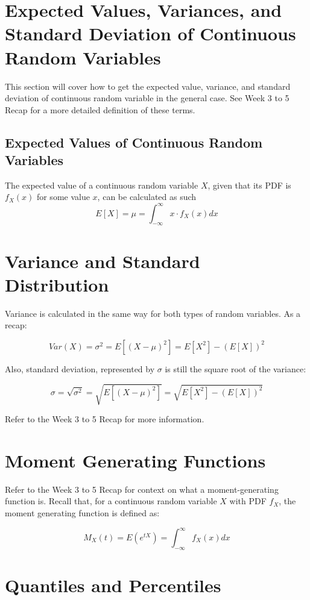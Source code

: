 \documentclass[12pt]{article}
\begin{document}
\section*{Expected Values, Variances, and Standard Deviation of Continuous Random
  Variables}

This section will cover how to get the expected value, variance, and standard
deviation of continuous random variable in the general case. See Week 3
to 5 Recap for a more detailed definition of these terms.

\subsection*{Expected Values of Continuous Random Variables}

The expected value of a continuous random variable $X$, given
that its PDF is $f_X(x)$ for some value $x$, can be calculated as such
\[
	E[X] = \mu = \int_{-\infty}^{\infty} x \cdot f_X(x) dx
\]

\section*{Variance and Standard Distribution}

Variance is calculated in the same way for both types of random variables.
As a recap:

\[
	Var(X) = \sigma^2 = E[(X-\mu)^2] = E[X^2] - (E[X])^2
\]

Also, standard deviation, represented by $\sigma$ is still the square root of
the variance:

\[
	\sigma = \sqrt{\sigma^2} = \sqrt{E[(X-\mu)^2]} = \sqrt{E[X^2] - (E[X])^2}
\]

Refer to the Week 3 to 5 Recap for more information.

\section*{Moment Generating Functions}

Refer to the Week 3 to 5 Recap for context on what a moment-generating
function is. Recall that, for a continuous random variable $X$ with PDF $f_X$,
the moment generating function is defined as:


\[
	M_X(t) = E(e^{tX}) = \int_{-\infty}^{\infty} f_X(x) dx
\]

\section*{Quantiles and Percentiles}
\end{document}
